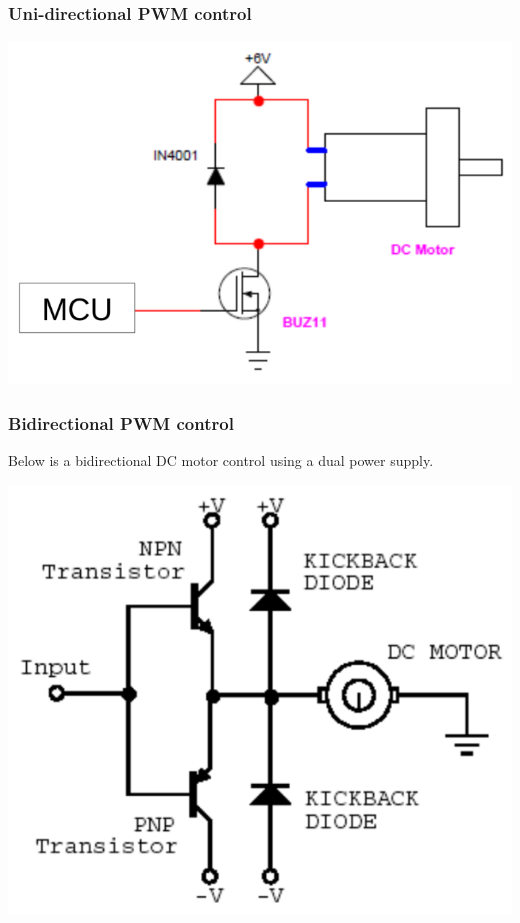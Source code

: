 \documentclass[11pt]{article}
\begin{document}
\subsubsection{Uni-directional PWM control}
\label{sec:org33f825c}
\begin{center}
\includegraphics[width=.9\linewidth]{./images/uni-directional-pwm-control.png}
\end{center}

\subsubsection{Bidirectional PWM control}
\label{sec:org4eab270}
Below is a bidirectional DC motor control using a dual power supply.

\begin{center}
\includegraphics[scale=1]{./images/bidirectional-pwm-control.png}
\end{center}
\end{document}
